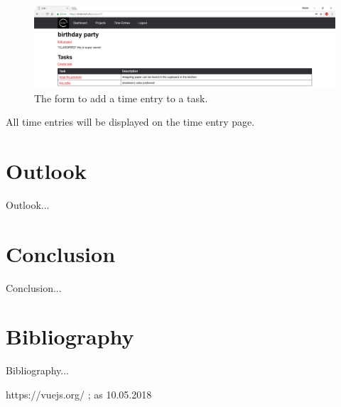 \documentclass[a4paper, 12pt, headsepline]{scrartcl}
\begin{document}
\begin{figure}[h]
    \includegraphics[width=\textwidth]{trckr-project-page}
    \caption{The form to add a time entry to a task.}
    \label{fig:trckr-create-time-entry}
\end{figure}

All time entries will be displayed on the time entry page.

\section{Outlook}
Outlook...

\section{Conclusion}
Conclusion...

\section{Bibliography}
Bibliography...
\begin{thebibliography}{9}

    https://vuejs.org/ ; as 10.05.2018


\end{thebibliography}

\listoffigures
\end{document}
